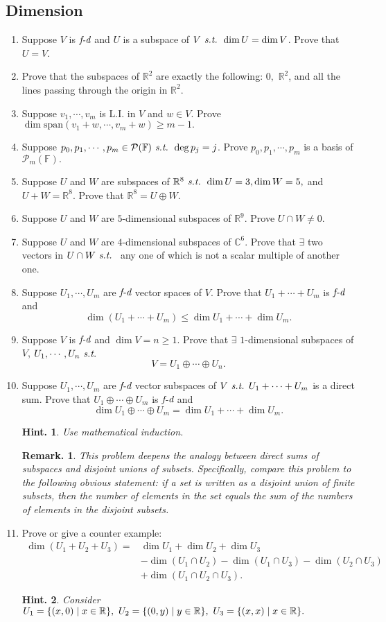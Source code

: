 \documentclass[11pt, letterpaper]{article}
\newtheorem*{hint}{Hint.}
\newtheorem*{rmk}{Remark.}
\def\R{\mathbb{R}}
\def\C{\mathbb{C}}
\def\F{\mathbb{F}}
\def\P{\mathcal{P}}
\def\st{\emph{ s.t. }}
\def\LI{\mathrm{L.I.}}
\def\FD{\emph{f-d}}
\def\span{\mathrm{span}}
\begin{document}
\subsection{Dimension}
\begin{enumerate}
	\item Suppose $V$ is $\FD$ and $U$ is a subspace of $V\st\dim U=\dim V$. Prove that $U=V$.
	\item Prove that the subspaces of $\R^2$ are exactly the following: $\qty{0},$ $\R^2$, and all the lines passing through the origin in $\R^2$.
	\item Suppose $v_1,\cdots,v_m$ is $\LI$ in $V$ and $w\in V.$ Prove $\dim\span(v_1+w,\cdots,v_m+w)\geq m-1.$
	\item Suppose $p_0,p_1,\cdots,p_m\in\P(\F)\st \deg p_j=j$. Prove $p_0,p_1,\cdots,p_m$ is a basis of $\P_m(\F).$
	\item Suppose $U$ and $W$ are subspaces of $\R^8\st\dim U=3,\dim W=5,$ and $U+W=\R^8.$ Prove that $\R^8=U\oplus W.$
	\item Suppose $U$ and $W$ are $5$-dimensional subspaces of $\R^9.$ Prove $U\cap W\neq\qty{0}.$
	\item Suppose $U$ and $W$ are $4$-dimensional subspaces of $\C^6$. Prove that $\exists$ two vectors in $U\cap W\st$ any one of which is not a scalar multiple of another one.
	\item Suppose $U_1,\cdots,U_m$ are $\FD$ vector spaces of $V$. Prove that $U_1+\cdots+U_m$ is $\FD$ and \[\dim(U_1+\cdots+U_m)\leq\dim U_1+\cdots+\dim U_m.\]
	\item Suppose $V$ is $\FD$ and $\dim V=n\geq1.$ Prove that $\exists$ $1$-dimensional subspaces of $V$, $U_1,\cdots,U_n\st$\[V=U_1\oplus\cdots\oplus U_n.\]
	\item Suppose $U_1,\cdots,U_m$ are $\FD$ vector subspaces of $V\st U_1+\cdots+U_m$ is a direct sum. Prove that $U_1\oplus\cdots\oplus U_m$ is $\FD$ and \[\dim U_1\oplus\cdots\oplus U_m=\dim U_1+\cdots+\dim U_m.\]\begin{hint}Use mathematical induction.\end{hint}\begin{rmk}This problem deepens the analogy between direct sums of subspaces and disjoint unions of subsets. Specifically, compare this problem to the following obvious statement: if a set is written as a disjoint union of finite subsets, then the number of elements in the set equals the sum of the numbers of elements in the disjoint subsets. \end{rmk}
	\item Prove or give a counter example: \[\begin{aligned}\dim(U_1+U_2+U_3)=&\dim U_1+\dim U_2+\dim U_3\\&-\dim(U_1\cap U_2)-\dim(U_1\cap U_3)-\dim(U_2\cap U_3)\\&+\dim(U_1\cap U_2\cap U_3).\end{aligned}\] \begin{hint}Consider $U_1=\qty{(x,0)\mid x\in\R},\ U_2=\qty{(0,y)\mid y\in\R},\ U_3=\qty{(x,x)\mid x\in\R}.$\end{hint}
\end{enumerate}
\end{document}
